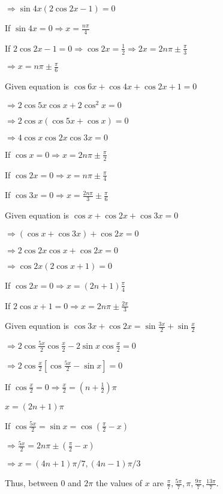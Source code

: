   $\Rightarrow \sin4x(2\cos2x - 1) = 0$

  If $\sin4x = 0 \Rightarrow x = \frac{n\pi}{4}$

  If $2\cos2x - 1 = 0 \Rightarrow \cos2x = \frac{1}{2}\Rightarrow 2x = 2n\pi \pm \frac{\pi}{3}$

  $\Rightarrow x = n\pi \pm \frac{\pi}{6}$

\item Given equation is $\cos6x + \cos 4x + \cos 2x + 1 = 0$

  $\Rightarrow 2\cos5x\cos x + 2\cos^2x = 0$

  $\Rightarrow 2\cos x(\cos5x + \cos x) = 0$

  $\Rightarrow 4\cos x\cos2x\cos3x = 0$

  If $\cos x = 0 \Rightarrow x = 2n\pi \pm\frac{\pi}{2}$

  If $\cos2x = 0 \Rightarrow x = n\pi \pm \frac{\pi}{4}$

  If $\cos3x = 0 \Rightarrow x = \frac{2n\pi}{3}\pm\frac{\pi}{6}$

\item Given equation is $\cos x + \cos 2x + \cos 3x = 0$

  $\Rightarrow (\cos x + \cos3x) + \cos 2x = 0$

  $\Rightarrow 2\cos2x\cos x + \cos 2x = 0$

  $\Rightarrow \cos2x(2\cos x + 1) = 0$

  If $\cos 2x = 0 \Rightarrow x = (2n + 1)\frac{\pi}{4}$

  If $2\cos x + 1 = 0 \Rightarrow x = 2n\pi\pm\frac{2\pi}{3}$

\item Given equation is $\cos3x + \cos2x = \sin\frac{3x}{2} +  \sin\frac{x}{2}$

  $\Rightarrow 2\cos\frac{5x}{2}\cos\frac{x}{2} - 2\sin x\cos\frac{x}{2} = 0$

  $\Rightarrow 2\cos\frac{x}{2}\left[\cos\frac{5x}{2} - \sin x\right] = 0$

  If $\cos\frac{x}{2} = 0 \Rightarrow \frac{x}{2} = \left(n + \frac{1}{2}\right)\pi$

  $x = (2n + 1)\pi$

  If $\cos\frac{5x}{2} = \sin x = \cos\left(\frac{\pi}{2} - x\right)$

  $\Rightarrow \frac{5x}{2} = 2n\pi \pm \left(\frac{\pi}{2} - x\right)$

  $\Rightarrow x = (4n + 1)\pi/7, (4n - 1)\pi/3$

  Thus, between $0$ and $2\pi$ the values of $x$ are $\frac{\pi}{7}, \frac{5\pi}{7}, \pi, \frac{9\pi}{7},
  \frac{13\pi}{7}.$

